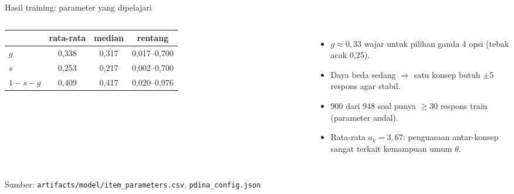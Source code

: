 \documentclass[aspectratio=169,10pt]{beamer}
\newcommand{\src}[1]{\par\vfill{\tiny\color{midgray}Sumber: #1}}
\begin{document}
\begin{frame}{Hasil training: parameter yang dipelajari}
  \begin{columns}[c]
    \setlength\figH{5.6cm}
    
    \footnotesize
    \begin{tabular}{@{}lccc@{}}
      \toprule
      & rata-rata & median & rentang \\
      \midrule
      $g$ & 0,338 & 0,317 & 0,017--0,700 \\
      $s$ & 0,253 & 0,217 & 0,002--0,700 \\
      $1-s-g$ & 0,409 & 0,417 & 0,020--0,976 \\
      \bottomrule
    \end{tabular}
    \vspace{0.6em}
    \begin{itemize}
      \item $g\approx0{,}33$ wajar untuk pilihan ganda 4 opsi (tebak acak 0,25).
      \item Daya beda sedang $\Rightarrow$ satu konsep butuh $\pm$5 respons agar stabil.
      \item 900 dari 948 soal punya $\ge$30 respons train (parameter andal).
      \item Rata-rata $a_k=3{,}67$: penguasaan antar-konsep sangat terkait kemampuan umum $\theta$.
    \end{itemize}
  \end{columns}
  \src{\texttt{artifacts/model/item\_parameters.csv}, \texttt{pdina\_config.json}}
\end{frame}
\end{document}
